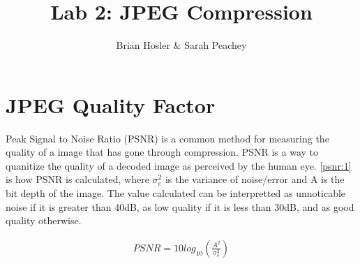 \documentclass{article}
\begin{document}
\title{Lab 2: JPEG Compression}
\author{Brian Hosler \& Sarah Peachey }
\maketitle 

\abstract{}
\tableofcontents
\newpage

\section{JPEG Quality Factor}

\qquad Peak Signal to Noise Ratio (PSNR) is a common method for measuring
the quality of a image that has gone through compression. PSNR is a way to
quanitize the quality of a decoded image as perceived by the human eye.
\eqref{psnr:1} is how PSNR is calculated, where $\sigma_e^2$ is the variance
of noise/error and A is the bit depth of the image. The value calculated can
be interpretted as unnoticable noise if it is greater than 40dB, as low
quality if it is less than 30dB, and as good quality otherwise. 

\begin{align}
	PSNR=10log_{10}(\frac{A^2}{\sigma_e^2})\label{psnr:1}
\end{align} 
\end{document}
